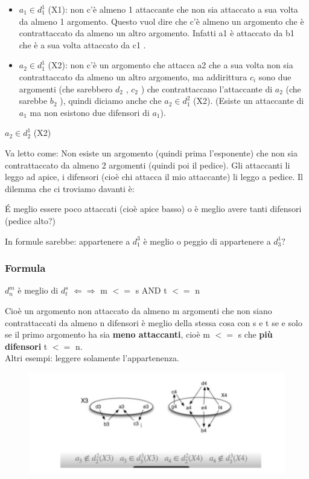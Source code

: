     \begin{itemize}
        \item $a_1 \in d^1_1$ (X1): non c'è almeno 1 attaccante che non sia
              attaccato a sua volta da almeno 1 argomento. Questo vuol dire che c'è
              almeno un argomento che è contrattaccato da almeno un altro argomento.
              Infatti a1 è attaccato da b1 che è a sua volta attaccato da c1 .
        \item $a_2 \in d^1_1$ (X2): non c'è un argomento che attacca a2 che a
              sua volta non sia contrattaccato da almeno un altro argomento, ma
              addirittura $c_i$ sono due argomenti (che sarebbero $d_2$ , $c_2$ ) che
              contrattaccano l'attaccante di $a_2$ (che sarebbe $b_2$ ), quindi
              diciamo anche che $a_2 \in d^2_1$ (X2). (Esiste un attaccante di $a_1$
              ma non esistono due difensori di $a_1$).
    \end{itemize}
    \begin{center}
        $a_2 \in d^1_2$ (X2)
    \end{center}
    Va letto come: Non esiste un argomento (quindi prima l'esponente) che non
    sia contrattaccato da almeno 2 argomenti (quindi poi il pedice). Gli
    attaccanti li leggo ad apice, i difensori (cioè chi attacca il mio
    attaccante) li leggo a pedice. Il dilemma che ci troviamo davanti è:
    \begin{center}
        É meglio essere poco attaccati (cioè apice basso) o è meglio avere tanti
        difensori (pedice alto?)
    \end{center}
    In formule sarebbe: appartenere a $d^3_1$ è meglio o peggio di appartenere a
$d^1_3?$
    \subsubsection{Formula}
    \begin{center}
        $d^m_n$ è meglio di $d^s_t$ $\Leftarrow \Rightarrow$ m $<=$ s AND t $<=$
        n
    \end{center}
    Cioè un argomento non attaccato da almeno m argomenti che non siano
    contrattaccati da almeno n difensori è meglio della stessa cosa con s e t se
    e solo se il primo argomento ha sia \textbf{meno attaccanti}, cioè m $<=$ s
    che \textbf{più difensori} t $<=$ n. \\Altri esempi: leggere solamente
    l'appartenenza.
    \begin{figure}[H]
        \centering
        \includegraphics[width=12cm, keepaspectratio]{img/Cap8/defense2.png}
    \end{figure}

